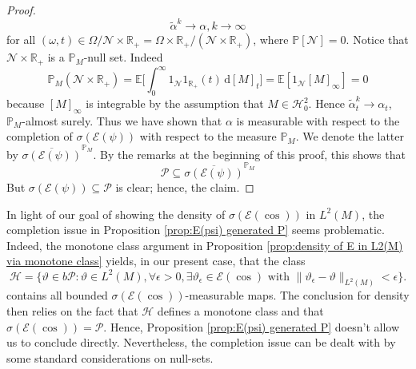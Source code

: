 \documentclass[11pt,a4paper,twoside,openany]{report}
\numberwithin{equation}{section}
\newcommand{\diff}{\mathrm{d}}
\theoremstyle{plain} %
\theoremstyle{definition} %
\theoremstyle{remark} %
\begin{document}
\begin{proof}
    \begin{equation*}
        \widetilde{\alpha}^{k}\to\alpha,k\to\infty
    \end{equation*}
    for all \((\omega,t)\in\Omega/\mathcal{N}\times\mathbb{R}_+=\Omega\times\mathbb{R}_+/(\mathcal{N}\times \mathbb{R}_+)\), where \(\mathbb{P}[\mathcal{N}]=0\). Notice that  \(\mathcal{N}\times\mathbb{R}_+\) is a \(\mathbb{P}_M\)-null set. Indeed 
    \begin{equation*}
        \mathbb{P}_M(\mathcal{N}\times\mathbb{R}_+)=\mathbb{E}\bigg[\int_0^{\infty}1_\mathcal{N}1_{\mathbb{R}_+}(t)\,\diff [M]_t\bigg]=\mathbb{E}[1_\mathcal{N}[M]_{\infty}]=0
    \end{equation*}
    because \([M]_{\infty}\) is integrable by the assumption that \(M\in\mathcal{H}_{0}^2\). Hence \(\widetilde{\alpha}_t^k\to \alpha_t\), \(\mathbb{P}_M\)-almost surely. Thus we have shown that \(\alpha\) is measurable with respect to the completion of \(\sigma(\mathcal{E}(\psi))\) with respect to the measure \(\mathbb{P}_M\). We denote the latter by \(\overline{\sigma(\mathcal{E}(\psi))}^{\mathbb{P}_M}\). By the remarks at the beginning of this proof, this shows that 
     \begin{equation*}
        \mathcal{P}\subseteq\overline{\sigma(\mathcal{E}(\psi))}^{\mathbb{P}_M}
    \end{equation*}
    But \(\sigma(\mathcal{E}(\psi))\subseteq\mathcal{P}\) is clear; hence, the claim. 
\end{proof}
In light of our goal of showing the density of \(\sigma(\mathcal{E}(\cos))\) in \(L^2(M)\), the completion issue in Proposition \ref{prop:E(psi) generated P} seems problematic. Indeed, the monotone class argument in Proposition \ref{prop:density of E in L2(M) via monotone class} yields, in our present case, that the class 
\begin{equation*}
     \mathcal{H}=\{ \vartheta\in b\mathcal{P}:\vartheta\in L^2(M),\forall \epsilon>0, \exists \vartheta_{\epsilon}\in \mathcal{E}(\cos)\text{ with }\lVert \vartheta_{\epsilon}-\vartheta\rVert_{L^2(M)}<\epsilon\}.
\end{equation*}
contains all bounded \(\sigma(\mathcal{E}(\cos))\)-measurable maps. The conclusion for density then relies on the fact that \(\mathcal{H}\) defines a monotone class and that \(\sigma(\mathcal{E}(\cos))=\mathcal{P}\).  Hence, Proposition \ref{prop:E(psi) generated P} doesn't allow us to conclude directly. Nevertheless, the completion issue can be dealt with by some standard considerations on null-sets.
\end{document}
